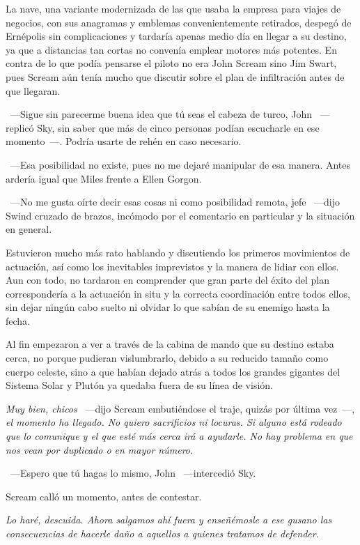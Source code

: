 La nave, una variante modernizada de las que usaba la empresa para viajes de negocios, con sus anagramas y emblemas convenientemente retirados, despegó de Ernépolis sin complicaciones y tardaría apenas medio día en llegar a su destino, ya que a distancias tan cortas no convenía emplear motores más potentes. En contra de lo que podía pensarse el piloto no era John Scream sino Jim Swart, pues Scream aún tenía mucho que discutir sobre el plan de infiltración antes de que llegaran.

~---Sigue sin parecerme buena idea que tú seas el cabeza de turco, John ~---replicó Sky, sin saber que más de cinco personas podían escucharle en ese momento~---. Podría usarte de rehén en caso necesario.

~---Esa posibilidad no existe, pues no me dejaré manipular de esa manera. Antes ardería igual que Miles frente a Ellen Gorgon.

~---No me gusta oírte decir esas cosas ni como posibilidad remota, jefe ~---dijo Swind cruzado de brazos, incómodo por el comentario en particular y la situación en general.

Estuvieron mucho más rato hablando y discutiendo los primeros movimientos de actuación, así como los inevitables imprevistos y la manera de lidiar con ellos. Aun con todo, no tardaron en comprender que gran parte del éxito del plan correspondería a la actuación in situ y la correcta coordinación entre todos ellos, sin dejar ningún cabo suelto ni olvidar lo que sabían de su enemigo hasta la fecha.

Al fin empezaron a ver a través de la cabina de mando que su destino estaba cerca, no porque pudieran vislumbrarlo, debido a su reducido tamaño como cuerpo celeste, sino a que habían dejado atrás a todos los grandes gigantes del Sistema Solar y Plutón ya quedaba fuera de su línea de visión.

\emph{Muy bien, chicos} ~---dijo Scream embutiéndose el traje, quizás por última vez~---, \emph{el momento ha llegado. No quiero sacrificios ni locuras. Si alguno está rodeado que lo comunique y el que esté más cerca irá a ayudarle. No hay problema en que nos vean por duplicado o en mayor número.}

~---Espero que tú hagas lo mismo, John ~---intercedió Sky.

Scream calló un momento, antes de contestar.

\emph{Lo haré, descuida. Ahora salgamos ahí fuera y enseñémosle a ese gusano las consecuencias de hacerle daño a aquellos a quienes tratamos de defender.}


